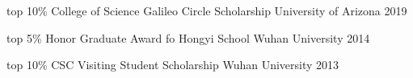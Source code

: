
\begin{cvhonors}

	\cvhonor
		{top 10\%}%
		{College of Science Galileo Circle Scholarship}%
		{University of Arizona}%
		{2019}%


	\cvhonor
		{top 5\%}%
		{Honor Graduate Award fo Hongyi School}%
		{Wuhan University}%
		{2014}%

	\cvhonor
		{top 10\%}%
		{CSC Visiting Student Scholarship}%
		{Wuhan University}%
		{2013}%
\end{cvhonors}
